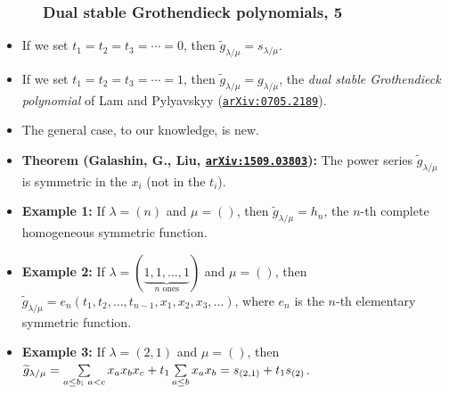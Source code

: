 \documentclass{beamer}
\newcommand{\red}{\color{red}}
\newcommand\arxiv[1]{\href{http://www.arxiv.org/abs/#1}{\texttt{arXiv:#1}}}
\newcommand{\lm}{\lambda / \mu}
\newcommand{\fti}[1]{\frametitle{\ \ \ \ \ #1}}
\newcommand{\defn}[1]{{\color{darkred}\emph{#1}}} %
\theoremstyle{plain}
\newcommand{\0}{\phantom{c}}
\newcommand{\wtg}{\widetilde{g}}
\let\sumnonlimits\sum
\renewcommand{\sum}{\sumnonlimits\limits}
\begin{document}
\begin{frame}
\fti{Dual stable Grothendieck polynomials, 5}

\begin{itemize}

\item If we set $t_1 = t_2 = t_3 = \cdots = 0$, then $\wtg_{\lm} = s_{\lm}$.

\pause
\item If we set $t_1 = t_2 = t_3 = \cdots = 1$, then $\wtg_{\lm} = g_{\lm}$, the \defn{dual stable Grothendieck polynomial} of Lam and Pylyavskyy ({\red \arxiv{0705.2189}}).

\item The general case, to our knowledge, is new.

\pause
\item \textbf{Theorem (Galashin, G., Liu, {\red \arxiv{1509.03803}}):} The power series $\wtg_{\lm}$ is symmetric in the $x_i$ (not in the $t_i$).

\pause
\item \textbf{Example 1:} If $\lambda = \left(n\right)$ and $\mu = \left(\right)$, then $\wtg_{\lm} = h_n$, the $n$-th complete homogeneous symmetric function.

\pause
\item \textbf{Example 2:} If $\lambda = \left(\underbrace{1, 1, \ldots, 1}_{n \text{ ones}}\right)$ and $\mu = \left(\right)$, then $\wtg_{\lm} = e_n\left(t_1, t_2, \ldots, t_{n-1}, x_1, x_2, x_3, \ldots\right)$, where $e_n$ is the $n$-th elementary symmetric function.

\pause
\item \textbf{Example 3:} If $\lambda = \left(2,1\right)$ and $\mu = \left(\right)$, then $\wtg_{\lm} = \sum\limits_{a\leq b; \ a < c} x_a x_b x_c + t_1 \sum\limits_{a \leq b} x_a x_b = s_{(2,1)} + t_1 s_{(2)}$.

\end{itemize}
\end{frame}
\end{document}
